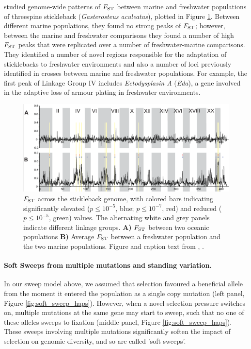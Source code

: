 \citet{hohenlohe2010population} studied genome-wide patterns of
$F_{\mathrm{ST}}$ between marine and freshwater populations of  threespine
stickleback ({\it Gasterosteus aculeatus}), plotted in Figure \ref{fig:local_sweep_stickleback}. 
Between different marine populations, they found no strong peaks of $F_{\mathrm{ST}}$;
however, between the marine and freshwater comparisons they found a
number of high $F_{\mathrm{ST}}$  peaks that were replicated over a number of
freshwater-marine comparisons. They identified a number of novel
regions responsible for the adaptation of sticklebacks to freshwater
environments and also a number of loci previously identified in crosses between marine and freshwater populations. For example, the first peak of Linkage
Group IV includes {\it Ectodysplasin A} ({\it Eda}), a gene involved in the adaptive loss of armour plating in freshwater environments.
\begin{figure}
\begin{center}
\includegraphics[width=0.9 \textwidth]{Journal_figs/recom_selection/Stickleback_FST/hohenlohe.png}
\end{center}
\caption{$F_{\mathrm{ST}}$ across the stickleback genome, with colored bars indicating
  significantly elevated ($p \leq 10^{−5}$, blue; $p \leq 10^{−7}$,
  red) and reduced ($p \leq 10^{−5}$, green) values. The alternating
  white and grey panels indicate different linkage groups. {\bf A)} $F_{\mathrm{ST}}$
  between two oceanic populations {\bf B)} Average $F_{\mathrm{ST}}$ between a
  freshwater population and the two marine populations. Figure and
  caption text from \citet{hohenlohe2010population}, \PLOSccBY.} \label{fig:local_sweep_stickleback}
\end{figure}


\paragraph{Soft Sweeps from multiple mutations and standing variation.}
In our sweep model above, we assumed that selection favoured a
beneficial allele from the moment it entered the population as a
single copy mutation  (left panel, Figure \ref{fig:soft_sweep_haps}). However, when a novel selection pressure
switches on, multiple mutations at the same gene
may start to sweep, such that no one of these alleles sweeps
to fixation (middle panel, Figure \ref{fig:soft_sweep_haps}). These sweeps involving multiple mutations significantly
soften the impact of selection on genomic diversity, and so are called 'soft sweeps'.

